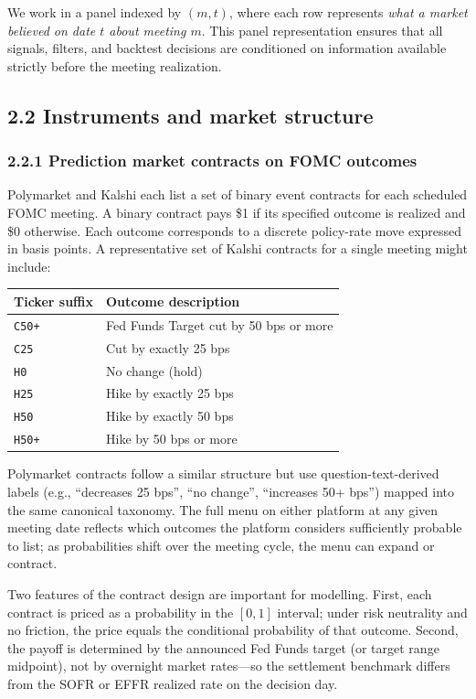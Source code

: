 We work in a panel indexed by $(m,t)$, where each row represents \emph{what a market believed on date $t$ about meeting $m$}. This panel representation ensures that all signals, filters, and backtest decisions are conditioned on information available strictly before the meeting realization.

\subsection*{2.2 Instruments and market structure}

\subsubsection*{2.2.1 Prediction market contracts on FOMC outcomes}

Polymarket and Kalshi each list a set of binary event contracts for each scheduled FOMC meeting. A binary contract pays \$1 if its specified outcome is realized and \$0 otherwise. Each outcome corresponds to a discrete policy-rate move expressed in basis points. A representative set of Kalshi contracts for a single meeting might include:

\begin{center}
\begin{tabular}{ll}
\hline
Ticker suffix & Outcome description \\
\hline
\texttt{C50+} & Fed Funds Target cut by 50 bps or more \\
\texttt{C25}  & Cut by exactly 25 bps \\
\texttt{H0}   & No change (hold) \\
\texttt{H25}  & Hike by exactly 25 bps \\
\texttt{H50}  & Hike by exactly 50 bps \\
\texttt{H50+} & Hike by 50 bps or more \\
\hline
\end{tabular}
\end{center}

Polymarket contracts follow a similar structure but use question-text-derived labels (e.g., ``decreases 25 bps'', ``no change'', ``increases 50+ bps'') mapped into the same canonical taxonomy. The full menu on either platform at any given meeting date reflects which outcomes the platform considers sufficiently probable to list; as probabilities shift over the meeting cycle, the menu can expand or contract.

Two features of the contract design are important for modelling. First, each contract is priced as a probability in the $[0,1]$ interval; under risk neutrality and no friction, the price equals the conditional probability of that outcome. Second, the payoff is determined by the announced Fed Funds target (or target range midpoint), not by overnight market rates---so the settlement benchmark differs from the SOFR or EFFR realized rate on the decision day.

